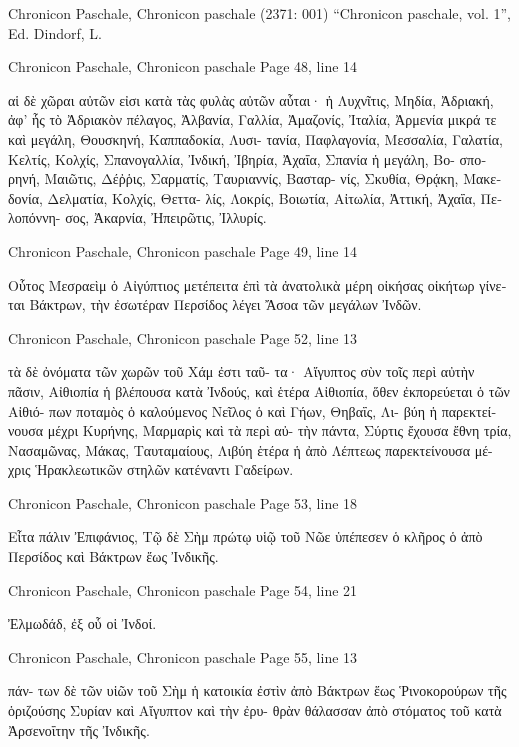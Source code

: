 \documentclass[12pt,letterpaper,twoside,final]{memoir}
\begin{document}
\begin{greek}

Chronicon Paschale, Chronicon paschale (2371: 001)
“Chronicon paschale, vol. 1”, Ed. Dindorf, L.

Chronicon Paschale, Chronicon paschale 
Page 48, line 14

                                      αἱ δὲ χῶραι αὐτῶν εἰσι κατὰ 
τὰς φυλὰς αὐτῶν αὗται· ἡ Λυχνῖτις, Μηδία, Ἀδριακή, ἀφ' 
ἧς τὸ Ἀδριακὸν πέλαγος, Ἀλβανία, Γαλλία, Ἀμαζονίς, Ἰταλία, 
Ἀρμενία μικρά τε καὶ μεγάλη, Θουσκηνή, Καππαδοκία, Λυσι-
τανία, Παφλαγονία, Μεσσαλία, Γαλατία, Κελτίς, Κολχίς, 
Σπανογαλλία, Ἰνδική, Ἰβηρία, Ἀχαΐα, Σπανία ἡ μεγάλη, Βο-
σπορηνή, Μαιῶτις, Δέῤῥις, Σαρματίς, Ταυριαννίς, Βασταρ-
νίς, Σκυθία, Θρᾴκη, Μακεδονία, Δελματία, Κολχίς, Θεττα-
λίς, Λοκρίς, Βοιωτία, Αἰτωλία, Ἀττική, Ἀχαΐα, Πελοπόννη-
σος, Ἀκαρνία, Ἠπειρῶτις, Ἰλλυρίς. 



Chronicon Paschale, Chronicon paschale 
Page 49, line 14

Οὗτος Μεσραεὶμ ὁ Αἰγύπτιος μετέπειτα ἐπὶ τὰ ἀνατολικὰ 
μέρη οἰκήσας οἰκήτωρ γίνεται Βάκτρων, τὴν ἐσωτέραν Περσίδος 
λέγει Ἄσοα τῶν μεγάλων Ἰνδῶν. 



Chronicon Paschale, Chronicon paschale 
Page 52, line 13

                  τὰ δὲ ὀνόματα τῶν χωρῶν τοῦ Χάμ ἐστι ταῦ-
τα· Αἴγυπτος σὺν τοῖς περὶ αὐτὴν πᾶσιν, Αἰθιοπία ἡ βλέπουσα 
κατὰ Ἰνδούς, καὶ ἑτέρα Αἰθιοπία, ὅθεν ἐκπορεύεται ὁ τῶν Αἰθιό-
πων ποταμὸς ὁ καλούμενος Νεῖλος ὁ καὶ Γήων, Θηβαΐς, Λι-
βύη ἡ παρεκτείνουσα μέχρι Κυρήνης, Μαρμαρὶς καὶ τὰ περὶ αὐ-
τὴν πάντα, Σύρτις ἔχουσα ἔθνη τρία, Νασαμῶνας, Μάκας, 
Ταυταμαίους, Λιβύη ἑτέρα ἡ ἀπὸ Λέπτεως παρεκτείνουσα μέ-
χρις Ἡρακλεωτικῶν στηλῶν κατέναντι Γαδείρων. 



Chronicon Paschale, Chronicon paschale 
Page 53, line 18

Εἶτα πάλιν Ἐπιφάνιος, Τῷ δὲ Σὴμ πρώτῳ υἱῷ τοῦ Νῶε 
ὑπέπεσεν ὁ κλῆρος ὁ ἀπὸ Περσίδος καὶ Βάκτρων ἕως Ἰνδικῆς. 



Chronicon Paschale, Chronicon paschale 
Page 54, line 21

  Ἐλμωδάδ, ἐξ οὗ οἱ Ἰνδοί. 



Chronicon Paschale, Chronicon paschale 
Page 55, line 13

                                                             πάν-
των δὲ τῶν υἱῶν τοῦ Σὴμ ἡ κατοικία ἐστὶν ἀπὸ Βάκτρων ἕως 
Ῥινοκορούρων τῆς ὁριζούσης Συρίαν καὶ Αἴγυπτον καὶ τὴν ἐρυ-
θρὰν θάλασσαν ἀπὸ στόματος τοῦ κατὰ Ἀρσενοΐτην τῆς Ἰνδικῆς. 




\end{greek}
\end{document}
